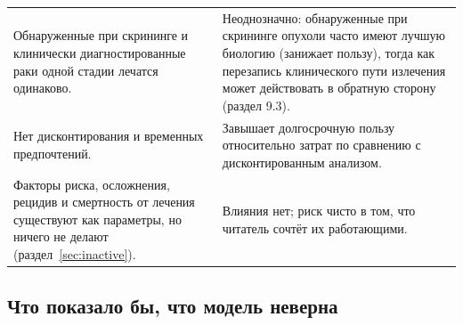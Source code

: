 \documentclass[12pt,a4paper]{article}
\begin{document}
{\begin{center}
\begin{tabular}{@{}p{8.0cm}p{7.6cm}@{}}
Обнаруженные при скрининге и клинически диагностированные раки одной стадии лечатся одинаково. &
Неоднозначно: обнаруженные при скрининге опухоли часто имеют лучшую биологию (занижает пользу), тогда как
перезапись клинического пути излечения может действовать в обратную сторону (раздел 9.3). \\
Нет дисконтирования и временных предпочтений. & Завышает долгосрочную пользу относительно затрат по
сравнению с дисконтированным анализом. \\
Факторы риска, осложнения, рецидив и смертность от лечения существуют как параметры, но ничего не делают
(раздел~\ref{sec:inactive}). & Влияния нет; риск чисто в том, что читатель сочтёт их работающими. \\
\bottomrule
\end{tabular}
\end{center}}

\subsection{Что показало бы, что модель неверна}
\end{document}
